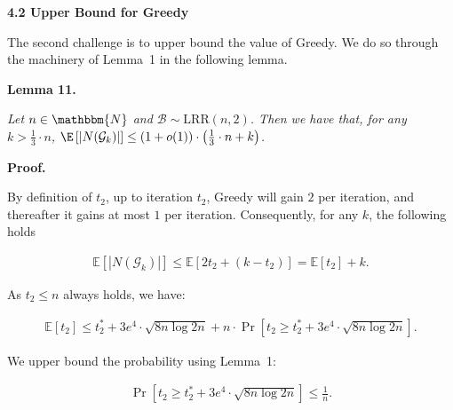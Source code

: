 \par\medskip\noindent\textbf{4.2 Upper Bound for Greedy}\par




The second challenge is to upper bound the value of Greedy. We do so through the machinery of Lemma 1 in the following lemma.\par





\par\medskip\noindent\textbf{\textbf{Lemma 11}\textbf{.}}\par



\emph{Let $n\in\mathbbm{N}$ and $\mathcal{B}\sim\text{{LRR}}\left(n,2\right)$.
Then we have that, for any $k>\frac{1}{3}\cdot n$, $\E\left[|N(\mathcal{G}_{k})|\right]\leq(1+o(1))\cdot\left(\frac{1}{3}\cdot n+k\right)$.}\par






\par\medskip\noindent\textbf{Proof.}\par



By definition of $t_{2}$, up to iteration $t_{2}$, Greedy will gain $2$ per iteration, and thereafter it gains at most $1$ per iteration. Consequently, for any $k$, the following holds\par


\[\begin{gathered}
\mathbb{E}\left[|N(\mathcal{G}_{k})|\right]\leq\mathbb{E}\left[2t_{2}+(k-t_{2})\right]=\mathbb{E}[t_{2}]+k.
\end{gathered}\]


As $t_{2}\leq n$ always holds, we have:\par


\[\begin{gathered}
\mathbb{E}[t_{2}]\leq t^{*}_{2}+3e^{4}\cdot\sqrt{8n\log{2n}}+n\cdot\Pr\left[t_{2}\geq t^{*}_{2}+3e^{4}\cdot\sqrt{8n\log{2n}}\right].
\end{gathered}\]


We upper bound the probability using Lemma 1:\par


\[\begin{gathered}
\Pr\left[t_{2}\geq t^{*}_{2}+3e^{4}\cdot\sqrt{8n\log{2n}}\right]\leq\frac{1}{n}.
\end{gathered}\]



